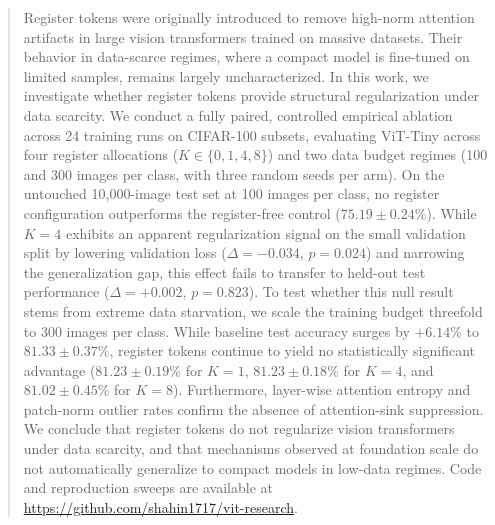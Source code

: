 \begin{abstract}
Register tokens were originally introduced to remove high-norm attention artifacts in large vision transformers trained on massive datasets. Their behavior in data-scarce regimes, where a compact model is fine-tuned on limited samples, remains largely uncharacterized. In this work, we investigate whether register tokens provide structural regularization under data scarcity. We conduct a fully paired, controlled empirical ablation across 24 training runs on CIFAR-100 subsets, evaluating ViT-Tiny across four register allocations ($K \in \{0, 1, 4, 8\}$) and two data budget regimes (100 and 300 images per class, with three random seeds per arm). On the untouched 10{,}000-image test set at 100 images per class, no register configuration outperforms the register-free control ($75.19 \pm 0.24\%$). While $K=4$ exhibits an apparent regularization signal on the small validation split by lowering validation loss ($\Delta = -0.034$, $p = 0.024$) and narrowing the generalization gap, this effect fails to transfer to held-out test performance ($\Delta = +0.002$, $p = 0.823$). To test whether this null result stems from extreme data starvation, we scale the training budget threefold to 300 images per class. While baseline test accuracy surges by $+6.14\%$ to $81.33 \pm 0.37\%$, register tokens continue to yield no statistically significant advantage ($81.23 \pm 0.19\%$ for $K=1$, $81.23 \pm 0.18\%$ for $K=4$, and $81.02 \pm 0.45\%$ for $K=8$). Furthermore, layer-wise attention entropy and patch-norm outlier rates confirm the absence of attention-sink suppression. We conclude that register tokens do not regularize vision transformers under data scarcity, and that mechanisms observed at foundation scale do not automatically generalize to compact models in low-data regimes. Code and reproduction sweeps are available at \url{https://github.com/shahin1717/vit-research}.
\end{abstract}
